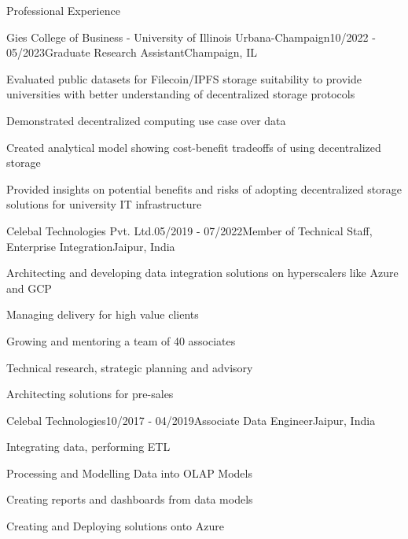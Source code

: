 \documentclass{resume} %
\begin{document}
\begin{rSection}{Professional Experience}
        \begin{rSubsection}{Gies College of Business - University of Illinois Urbana-Champaign}{10/2022 - 05/2023}{Graduate Research Assistant}{Champaign, IL}
                \item Evaluated public datasets for Filecoin/IPFS storage suitability to provide universities with better understanding of decentralized storage protocols
                \item Demonstrated decentralized computing use case over data
                \item Created analytical model showing cost-benefit tradeoffs of using decentralized storage
                \item Provided insights on potential benefits and risks of adopting decentralized storage solutions for university IT infrastructure
        \end{rSubsection}

        \begin{rSubsection}{Celebal Technologies Pvt. Ltd.}{05/2019 - 07/2022}{Member of Technical Staff, Enterprise Integration}{Jaipur, India}
            \item Architecting and developing data integration solutions on hyperscalers like Azure and GCP
            \item Managing delivery for high value clients
            \item Growing and mentoring a team of 40 associates
            \item Technical research, strategic planning and advisory
            \item Architecting solutions for pre-sales
        \end{rSubsection}
        
        \begin{rSubsection}{Celebal Technologies}{10/2017 - 04/2019}{Associate Data Engineer}{Jaipur, India}
            \item Integrating data, performing ETL
            \item Processing and Modelling Data into OLAP Models
            \item Creating reports and dashboards from data models
            \item Creating and Deploying solutions onto Azure
        \end{rSubsection}
        
        
    \end{rSection}
    
\end{document}
